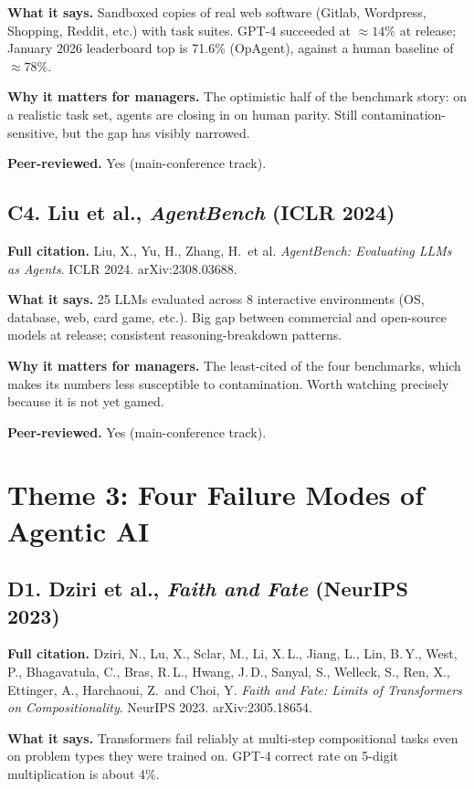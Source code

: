 \documentclass[11pt,a4paper]{article}
\begin{document}
\textbf{What it says.}
Sandboxed copies of real web software (Gitlab, Wordpress, Shopping,
Reddit, etc.) with task suites. GPT-4 succeeded at $\approx 14\%$ at
release; January 2026 leaderboard top is 71.6\% (OpAgent), against a
human baseline of $\approx 78\%$.

\textbf{Why it matters for managers.}
The optimistic half of the benchmark story: on a realistic task set,
agents are closing in on human parity. Still contamination-sensitive,
but the gap has visibly narrowed.

\textbf{Peer-reviewed.} Yes (main-conference track).

\subsection*{C4. Liu et al., \emph{AgentBench} (ICLR 2024)}

\textbf{Full citation.}
Liu, X., Yu, H., Zhang, H.\ et al.
\emph{AgentBench: Evaluating LLMs as Agents}. ICLR 2024.
arXiv:2308.03688.

\textbf{What it says.}
25 LLMs evaluated across 8 interactive environments (OS, database,
web, card game, etc.). Big gap between commercial and open-source
models at release; consistent reasoning-breakdown patterns.

\textbf{Why it matters for managers.}
The least-cited of the four benchmarks, which makes its numbers less
susceptible to contamination. Worth watching precisely because it is
not yet gamed.

\textbf{Peer-reviewed.} Yes (main-conference track).

\section*{Theme 3: Four Failure Modes of Agentic AI}

\subsection*{D1. Dziri et al., \emph{Faith and Fate} (NeurIPS 2023)}

\textbf{Full citation.}
Dziri, N., Lu, X., Sclar, M., Li, X.\,L., Jiang, L., Lin, B.\,Y.,
West, P., Bhagavatula, C., Bras, R.\,L., Hwang, J.\,D., Sanyal, S.,
Welleck, S., Ren, X., Ettinger, A., Harchaoui, Z.\ and Choi, Y.
\emph{Faith and Fate: Limits of Transformers on Compositionality}.
NeurIPS 2023. arXiv:2305.18654.

\textbf{What it says.}
Transformers fail reliably at multi-step compositional tasks even on
problem types they were trained on. GPT-4 correct rate on 5-digit
multiplication is about 4\%.
\end{document}
